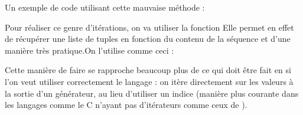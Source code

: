 \documentclass[letterpaper,10pt,english]{sphinxmanual}
\begin{document}
Un exemple de code utilisant cette mauvaise méthode :

\begin{sphinxVerbatim}[commandchars=\\\{\}]
  \PYG{p}{[}   \PYG{p}{]}

    
    \PYG{l+s+s2}{mylist[}\PYG{l+s+s2}{] = }   \PYG{p}{[}\PYG{p}{]} 
\end{sphinxVerbatim}

Pour réaliser ce genre d’itérations, on va utiliser la fonction Elle permet en effet de récupérer une liste de tuples  en fonction du contenu de la séquence et d’une manière très pratique.On l’utilise comme ceci :

\begin{sphinxVerbatim}[commandchars=\\\{\}]
    
    \PYG{l+s+s2}{mylist[}\PYG{l+s+s2}{] = }  
\end{sphinxVerbatim}

Cette manière de faire se rapproche beaucoup plus de ce qui doit être fait en  si l’on veut utiliser correctement le langage : on itère directement sur les valeurs à la sortie d’un générateur, au lieu d’utiliser un indice (manière plus courante dans les langages comme le C n’ayant pas d’itérateurs comme ceux de ).
\end{document}
